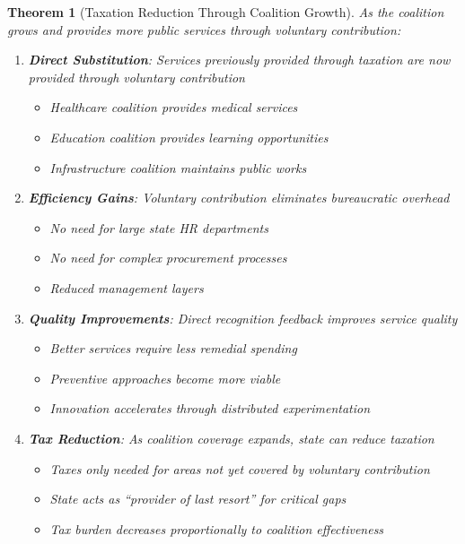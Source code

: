 \documentclass[11pt]{article}
\newtheorem{theorem}{Theorem}
\begin{document}
\begin{theorem}[Taxation Reduction Through Coalition Growth]
As the coalition grows and provides more public services through voluntary contribution:

\begin{enumerate}
\item \textbf{Direct Substitution}: Services previously provided through taxation are now provided through voluntary contribution
\begin{itemize}
\item Healthcare coalition provides medical services
\item Education coalition provides learning opportunities
\item Infrastructure coalition maintains public works
\end{itemize}

\item \textbf{Efficiency Gains}: Voluntary contribution eliminates bureaucratic overhead
\begin{itemize}
\item No need for large state HR departments
\item No need for complex procurement processes
\item Reduced management layers
\end{itemize}

\item \textbf{Quality Improvements}: Direct recognition feedback improves service quality
\begin{itemize}
\item Better services require less remedial spending
\item Preventive approaches become more viable
\item Innovation accelerates through distributed experimentation
\end{itemize}

\item \textbf{Tax Reduction}: As coalition coverage expands, state can reduce taxation
\begin{itemize}
\item Taxes only needed for areas not yet covered by voluntary contribution
\item State acts as ``provider of last resort'' for critical gaps
\item Tax burden decreases proportionally to coalition effectiveness
\end{itemize}
\end{enumerate}
\end{theorem}
\end{document}

